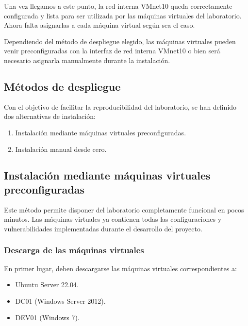 Una vez llegamos a este punto, la red interna VMnet10 queda correctamente configurada y lista para ser utilizada por las máquinas virtuales del laboratorio. Ahora falta asignarlas a cada máquina virtual según sea el caso.

Dependiendo del método de despliegue elegido, las máquinas virtuales pueden venir preconfiguradas con la interfaz de red interna VMnet10 o bien será necesario asignarla manualmente durante la instalación.

\subsection*{Métodos de despliegue}

Con el objetivo de facilitar la reproducibilidad del laboratorio, se han definido dos alternativas de instalación:

\begin{enumerate}
    \item Instalación mediante máquinas virtuales preconfiguradas.
    \item Instalación manual desde cero.
\end{enumerate}

\subsection*{Instalación mediante máquinas virtuales preconfiguradas}

Este método permite disponer del laboratorio completamente funcional en pocos minutos. Las máquinas virtuales ya contienen todas las configuraciones y vulnerabilidades implementadas durante el desarrollo del proyecto.

\subsubsection*{Descarga de las máquinas virtuales}

En primer lugar, deben descargarse las máquinas virtuales correspondientes a:

\begin{itemize}
    \item Ubuntu Server 22.04.
    \item DC01 (Windows Server 2012).
    \item DEV01 (Windows 7).
\end{itemize}

